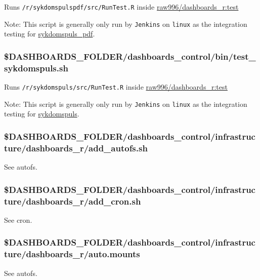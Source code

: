 \documentclass[12pt,]{article}
\begin{document}
Runs \texttt{/r/sykdomspulspdf/src/RunTest.R} inside
\href{https://github.com/raubreywhite/dashboards_control/blob/master/infrastructure/dashboards_r/Dockerfile}{raw996/dashboards\_r:test}

Note: This script is generally only run by \texttt{Jenkins} on
\texttt{linux} as the integration testing for
\href{https://folkehelseinstituttet.github.io/dashboards_sykdomspuls_pdf/}{sykdomspuls\_pdf}.

\subsubsection{\$DASHBOARDS\_FOLDER/dashboards\_control/bin/test\_sykdomspuls.sh}\label{dashboards_folderdashboards_controlbintest_sykdomspuls.sh}

Runs \texttt{/r/sykdomspuls/src/RunTest.R} inside
\href{https://github.com/raubreywhite/dashboards_control/blob/master/infrastructure/dashboards_r/Dockerfile}{raw996/dashboards\_r:test}

Note: This script is generally only run by \texttt{Jenkins} on
\texttt{linux} as the integration testing for
\href{https://folkehelseinstituttet.github.io/dashboards_sykdomspuls/}{sykdomspuls}.

\subsubsection{\$DASHBOARDS\_FOLDER/dashboards\_control/infrastructure/dashboards\_r/add\_autofs.sh}\label{dashboards_folderdashboards_controlinfrastructuredashboards_radd_autofs.sh}

See \protect\hypertarget{autofs}{}{autofs}.

\subsubsection{\$DASHBOARDS\_FOLDER/dashboards\_control/infrastructure/dashboards\_r/add\_cron.sh}\label{dashboards_folderdashboards_controlinfrastructuredashboards_radd_cron.sh}

See \protect\hypertarget{cron}{}{cron}.

\subsubsection{\$DASHBOARDS\_FOLDER/dashboards\_control/infrastructure/dashboards\_r/auto.mounts}\label{dashboards_folderdashboards_controlinfrastructuredashboards_rauto.mounts}

See \protect\hypertarget{autofs}{}{autofs}.
\end{document}
